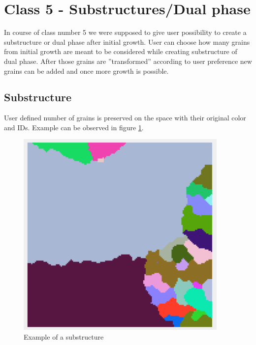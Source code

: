 \documentclass[a4paper, 11pt]{article}
\begin{document}
\section*{Class 5 - Substructures/Dual phase}
In course of class number 5 we were supposed to give user possibility to create a substructure or dual phase after initial growth. User can choose how many grains from initial growth are meant to be considered while creating substructure of dual phase. After those grains are ''transformed'' according to user preference new grains can be added and once more growth is possible.
\subsection{Substructure}
User defined number of grains is preserved on the space with their original color and IDs. Example can be observed in figure \ref{SubstructureExampleLabel}.
\begin{figure}[H]
\centering
  \includegraphics[]{SubstructureExample}
  \caption{Example of a substructure}
  \label{SubstructureExampleLabel}
\end{figure}
\end{document}
